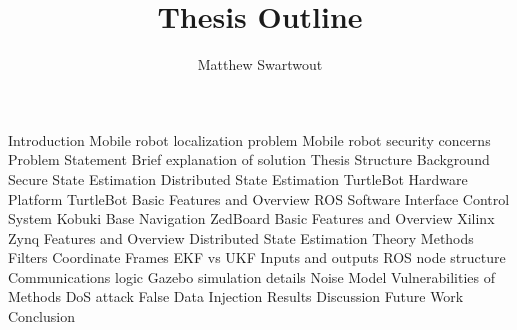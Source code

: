 \documentclass{article}
\begin{document}
\title{Thesis Outline}
\author{Matthew Swartwout}
\maketitle

\begin{outline}
\1 Introduction
    \2 Mobile robot localization problem
    \2 Mobile robot security concerns
    \2 Problem Statement
    \2 Brief explanation of solution
    \2 Thesis Structure
\1 Background
    \2 Secure State Estimation
    \2 Distributed State Estimation
    \2 TurtleBot
\1 Hardware Platform
    \2 TurtleBot
        \3 Basic Features and Overview
        \3 ROS Software Interface
        \3 Control System
            \4 Kobuki Base
            \4 Navigation
    \2 ZedBoard
        \3 Basic Features and Overview
        \3 Xilinx Zynq Features and Overview
\1 Distributed State Estimation
    \2 Theory
    \2 Methods
        \3 Filters
            \4 Coordinate Frames
            \4 EKF vs UKF
            \4 Inputs and outputs
        \3 ROS node structure
        \3 Communications logic
        \3 Gazebo simulation details
            \4 Noise Model
    \2 Vulnerabilities of Methods
        \3 DoS attack
        \3 False Data Injection
\1 Results
\1 Discussion
    \2 Future Work
\1 Conclusion
\end{outline}
\end{document}

